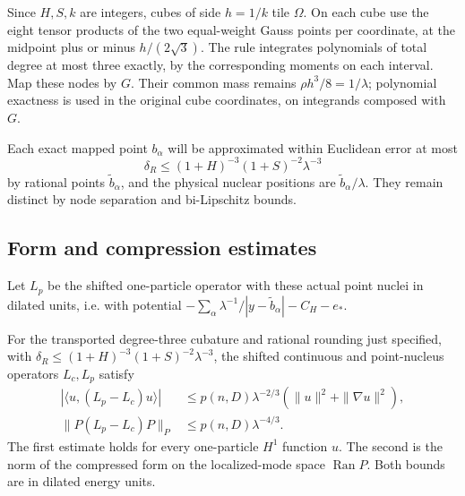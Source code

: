 Since \(H,S,k\) are integers, cubes of side \(h=1/k\) tile
\(\Omega\). On each cube use the eight tensor products of the two
equal-weight Gauss points per coordinate, at the midpoint plus or minus
\(h/(2\sqrt3)\). The rule integrates polynomials of total degree at
most three exactly, by the corresponding moments on each interval.
Map these nodes by \(G\). Their common mass remains
\(\rho h^3/8=1/\lambda\); polynomial exactness is used in the
original cube coordinates, on integrands composed with \(G\).

Each exact mapped point \(b_\alpha\) will be approximated within
Euclidean error at most
\[
                    \delta_R\le (1+H)^{-3}(1+S)^{-2}\lambda^{-3}
\]
by rational points \(\tilde b_\alpha\), and the physical nuclear positions are \(\tilde b_\alpha/\lambda\). They remain distinct by node separation and bi-Lipschitz bounds.

\subsection{Form and compression estimates}\label{subsec:nuclear-errors}

Let \(L_p\) be the shifted one-particle operator with these actual point nuclei in dilated units, i.e. with potential \(-\sum_\alpha \lambda^{-1}/|y-\tilde b_\alpha|-C_H-e_*\). \begin{proposition}\label{prop:nuclear-replacement}
For the transported degree-three cubature and rational rounding just
specified, with $\delta_R\le(1+H)^{-3}(1+S)^{-2}\lambda^{-3}$, the
shifted continuous and point-nucleus operators $L_c,L_p$ satisfy
\[
 \begin{split}
 |\langle u,(L_p-L_c)u\rangle|
      &\le p(n,D)\lambda^{-2/3}(\|u\|^2+\|\nabla u\|^2),\\
 \|P(L_p-L_c)P\|_{P}
      &\le p(n,D)\lambda^{-4/3}.
 \end{split}                                               \tag{7}\label{eq:7}
\]
The first estimate holds for every one-particle $H^1$ function $u$.
The second is the norm of the compressed form on the localized-mode
space $\operatorname{Ran}P$. Both bounds are in dilated energy units.
\end{proposition}

